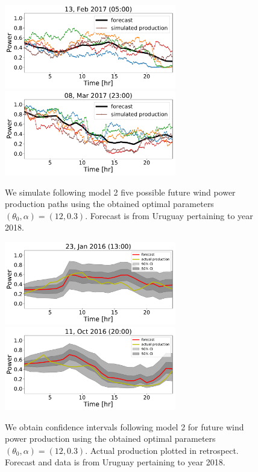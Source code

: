 \documentclass[10pt,twocolumn,letterpaper]{article}
\begin{document}
    \begin{figure}
      \includegraphics[width=75mm,scale=1]{simulated/24hr/1099.pdf}
      \includegraphics[width=75mm,scale=1]{simulated/24hr/1178.pdf}
      \caption{We simulate following model 2  five possible future wind power production paths using the obtained optimal parameters $(\theta_0, \alpha )=(12,0.3)$. Forecast is from Uruguay pertaining to  year 2018. }
    \end{figure}


    \begin{figure}
      \includegraphics[width=75mm,scale=1]{confidence_intervals/24hr/31.pdf}
      \includegraphics[width=75mm,scale=1]{confidence_intervals/24hr/820.pdf}
       \caption{We obtain confidence intervals following model 2  for future wind power production using the obtained optimal parameters $(\theta_0, \alpha )=(12,0.3)$. Actual production plotted in retrospect. Forecast and data is from Uruguay pertaining to  year 2018. }
    \end{figure}
\end{document}
